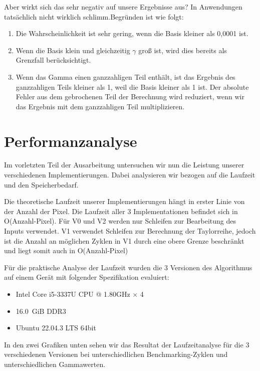 \documentclass[course=erap]{aspdoc}
\begin{document}
\par
Aber wirkt sich das sehr negativ auf unsere Ergebnisse aus? In Anwendungen tatsächlich nicht wirklich schlimm.Begründen ist wie folgt:
\begin{enumerate}
\item Die Wahrscheinlichkeit ist sehr gering, wenn die Basis kleiner als 0,0001 ist.
\item Wenn die Basis klein und gleichzeitig $\gamma$ groß ist, wird dies bereits als Grenzfall berücksichtigt.
\item Wenn das Gamma einen ganzzahligen Teil enthält, ist das Ergebnis des ganzzahligen Teils kleiner als 1, weil die Basis kleiner als 1 ist. Der absolute Fehler aus dem gebrochenen Teil der Berechnung wird reduziert, wenn wir das Ergebnis mit dem ganzzahligen Teil multiplizieren.
\end{enumerate}


\section{Performanzanalyse}
\par
Im vorletzten Teil der Ausarbeitung untersuchen wir nun die Leistung unserer verschiedenen Implementierungen. Dabei analysieren wir bezogen auf die Laufzeit und den Speicherbedarf.

\par
Die theoretische Laufzeit unserer Implementierungen hängt in erster Linie von der Anzahl der Pixel. Die Laufzeit aller 3 Implementationen befindet sich in O(Anzahl-Pixel). Für V0 und V2 werden nur Schleifen zur Bearbeitung des Inputs verwendet. V1 verwendet Schleifen zur Berechnung der Taylorreihe, jedoch ist die Anzahl an möglichen Zyklen in V1 durch eine obere Grenze beschränkt und liegt somit auch in O(Anzahl-Pixel)

\par
Für die praktische Analyse der Laufzeit wurden die 3 Versionen des Algorithmus auf einem Gerät mit folgender Spezifikation evaluiert:

\begin{itemize}
\item Intel Core i5-3337U CPU @ 1.80GHz × 4
\item 16.0 GiB DDR3
\item Ubuntu 22.04.3 LTS 64bit
\end{itemize}

\par
In den zwei Grafiken unten sehen wir das Resultat der Laufzeitanalyse für die 3 verschiedenen Versionen bei unterschiedlichen Benchmarking-Zyklen und unterschiedlichen Gammawerten.
\end{document}

